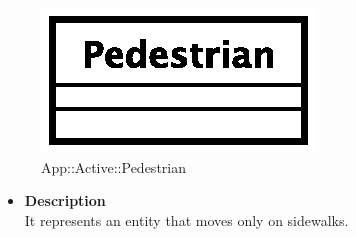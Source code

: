 \begin{figure}[h]
\centering
\includegraphics[scale=0.6,keepaspectratio]{images/solution/pedestrian.eps}
\caption{App::Active::Pedestrian}
\label{fig:sd-app-pedestrian}
\end{figure}
\FloatBarrier
\begin{itemize}
  \item \textbf{Description} \\
It represents an entity that moves only on sidewalks.
\end{itemize} 
